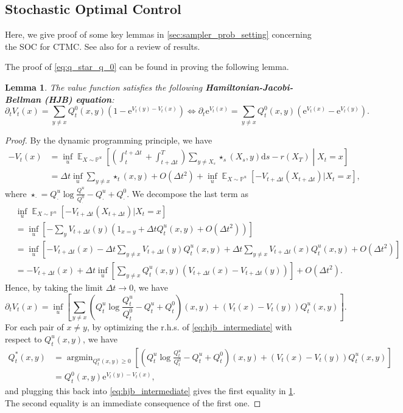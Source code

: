 \documentclass{article}
\newtheorem{lemma}{Lemma}
\theoremstyle{remark}
\newcommand{\ro}[1]{\left(#1\right)} %
\newcommand{\sq}[1]{\left[#1\right]} %
\newcommand{\e}{\mathrm{e}}
\renewcommand{\P}{\mathbb{P}}
\newcommand{\E}{\operatorname{\mathbb{E}}}
\renewcommand{\d}{\mathrm{d}}
\newcommand{\argmin}{\mathop\mathrm{argmin}}
\begin{document}
\subsection{Stochastic Optimal Control}
\label{app:theory_soc}
Here, we give proof of some key lemmas in \cref{sec:sampler_prob_setting} concerning the SOC for CTMC. See also \cite{wang2025finetuning} for a review of results.

The proof of \cref{eq:q_star_q_0} can be found in proving the following lemma.
\begin{lemma}
    The value function satisfies the following \textbf{Hamiltonian-Jacobi-Bellman (HJB) equation}:
    \begin{equation}
        \partial_tV_t(x)=\sum_{y\ne x}Q^0_t(x,y)(1-\e^{V_t(y)-V_t(x)})\iff\partial_t\e^{V_t(x)}=\sum_{y\ne x}Q^0_t(x,y)(\e^{V_t(x)}-\e^{V_t(y)}).
        \label{eq:hjb}
    \end{equation}
    \label{lem:hjb}
\end{lemma}
\begin{proof}
By the dynamic programming principle, we have
\begin{align*}
    -V_t(x)&=\inf_u\E_{X\sim\P^u}\sq{\ro{\int_t^{t+\Delta t}+\int_{t+\Delta t}^T}\sum_{y\ne X_s}\star_s(X_s,y)\d s-r(X_T)\middle|X_t=x}\\
    &=\Delta t\inf_u\sum_{y\ne x}\star_t(x,y)+O(\Delta t^2)+\inf_u\E_{X\sim\P^u}[-V_{t+\Delta t}(X_{t+\Delta t})|X_t=x],
\end{align*}
where $\star_\cdot=Q^u_\cdot\log\frac{Q^u_\cdot}{Q^0_\cdot}-Q^u_\cdot+Q^0_\cdot$. We decompose the last term as
\begin{align*}
    &\inf_u\E_{X\sim\P^u}[-V_{t+\Delta t}(X_{t+\Delta t})|X_t=x]\\
    &=\inf_u\sq{-\sum_yV_{t+\Delta t}(y)\ro{1_{x=y}+\Delta tQ^u_t(x,y)+O(\Delta t^2)}}\\
    &=\inf_u\sq{-V_{t+\Delta t}(x)-\Delta t\sum_{y\ne x}V_{t+\Delta t}(y)Q^u_t(x,y)+\Delta t\sum_{y\ne x}V_{t+\Delta t}(x)Q^u_t(x,y)+O(\Delta t^2)}\\
    &=-V_{t+\Delta t}(x)+\Delta t\inf_u\sq{\sum_{y\ne x}Q^u_t(x,y)(V_{t+\Delta t}(x)-V_{t+\Delta t}(y))}+O(\Delta t^2).
\end{align*}
Hence, by taking the limit $\Delta t\to0$, we have
\begin{equation}
    \partial_tV_t(x)=\inf_u\sq{\sum_{y\ne x}\ro{Q^u_t\log\frac{Q^u_t}{Q^0_t}-Q^u_t+Q^0_t}(x,y)+(V_t(x)-V_t(y))Q^u_t(x,y)}.
    \label{eq:hjb_intermediate}
\end{equation}
For each pair of $x\ne y$, by optimizing the r.h.s. of \cref{eq:hjb_intermediate} with respect to $Q^u_t(x,y)$, we have
\begin{align*}
    Q^*_t(x,y)&=\argmin_{Q^u_t(x,y)\ge0}\sq{\ro{Q^u_t\log\frac{Q^u_t}{Q^0_t}-Q^u_t+Q^0_t}(x,y)+(V_t(x)-V_t(y))Q^u_t(x,y)}\\
    &=Q^0_t(x,y)\e^{V_t(y)-V_t(x)},
\end{align*}
and plugging this back into \cref{eq:hjb_intermediate} gives the first equality in \cref{lem:hjb}. The second equality is an immediate consequence of the first one.
\end{proof}
\end{document}
